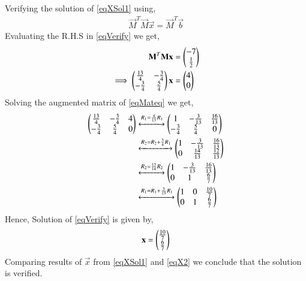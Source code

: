 \documentclass[journal,12pt,twocolumn]{IEEEtran}
\begin{document}
Verifying the solution of \eqref{eqXSol1} using,
\begin{align}
\vec{M}^T\vec{M}\vec{x} = \vec{M}^T\vec{b}\label{eqVerify}
\end{align}
Evaluating the R.H.S in \eqref{eqVerify} we get,
\begin{align}
\mathbf{M}^T\mathbf{M}\mathbf{x} &= \begin{pmatrix}-7\\\frac{1}{2}\end{pmatrix}\\
\implies\begin{pmatrix}\frac{13}{4}& -\frac{3}{4}\\ -\frac{3}{4}&\frac{5}{4}\end{pmatrix}\mathbf{x} &= \begin{pmatrix}4\\0\end{pmatrix}\label{eqMateq}
\end{align}
Solving the augmented matrix of \eqref{eqMateq} we get,
\begin{align}
\begin{pmatrix}\frac{13}{4}&-\frac{3}{4}& 4 \\-\frac{3}{4}&\frac{5}{4}& 0\end{pmatrix} &\xleftrightarrow{R_1=\frac{4}{13}R_1}\begin{pmatrix}1&-\frac{3}{13}&\frac{16}{13}\\ -\frac{3}{4}&\frac{5}{4}&0\end{pmatrix}\\
&\xleftrightarrow{R_2=R_2+\frac{3}{4}R_1}\begin{pmatrix}1&-\frac{3}{13}&\frac{16}{13}\\0 & \frac{14}{13}&\frac{12}{13}\end{pmatrix}\\
&\xleftrightarrow{R_2=\frac{13}{14}R_2}\begin{pmatrix}1& -\frac{3}{13}&\frac{16}{13}\\ 0 & 1 &\frac{6}{7}\end{pmatrix}\\
&\xleftrightarrow{R_1=R_1+\frac{3}{13}R_1}\begin{pmatrix}1&0&\frac{10}{7}\\0&1&\frac{6}{7}\end{pmatrix}
\end{align}
Hence, Solution of \eqref{eqVerify} is given by,
\begin{align}
\mathbf{x}=\begin{pmatrix}\frac{10}{7}\\\frac{6}{7}\end{pmatrix}\label{eqX2}
\end{align}
Comparing results of $\vec{x}$ from \eqref{eqXSol1} and \eqref{eqX2} we conclude that the solution is verified.















 
\end{document}
